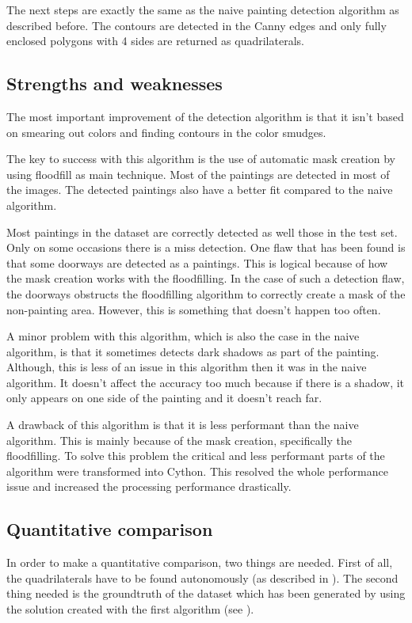 The next steps are exactly the same as the naive painting detection algorithm as described before. The contours are detected in the Canny edges and only fully enclosed polygons with 4 sides are returned as quadrilaterals.

\subsection{Strengths and weaknesses}

The most important improvement of the detection algorithm is that it isn't based on smearing out colors and finding contours in the color smudges.

The key to success with this algorithm is the use of automatic mask creation by using floodfill as main technique. Most of the paintings are detected in most of the images. The detected paintings also have a better fit compared to the naive algorithm.

Most paintings in the dataset are correctly detected as well those in the test set. Only on some occasions there is a miss detection. One flaw that has been found is that some doorways are detected as a paintings. This is logical because of how the mask creation works with the floodfilling. In the case of such a detection flaw, the doorways obstructs the floodfilling algorithm to correctly create a mask of the non-painting area. However, this is something that doesn't happen too often.

A minor problem with this algorithm, which is also the case in the naive algorithm, is that it sometimes detects dark shadows as part of the painting. Although, this is less of an issue in this algorithm then it was in the naive algorithm. It doesn't affect the accuracy too much because if there is a shadow, it only appears on one side of the painting and it doesn't reach far.

A drawback of this algorithm is that it is less performant than the naive algorithm. This is mainly because of the mask creation, specifically the floodfilling. To solve this problem the critical and less performant parts of the algorithm were transformed into Cython. This resolved the whole performance issue and increased the processing performance drastically. \cite{behnel2011cython}

\subsection{Quantitative comparison}
In order to make a quantitative comparison, two things are needed. First of all, the quadrilaterals have to be found autonomously (as described in ). The second thing needed is the groundtruth of the dataset which has been generated by using the solution created with the first algorithm (see ).

